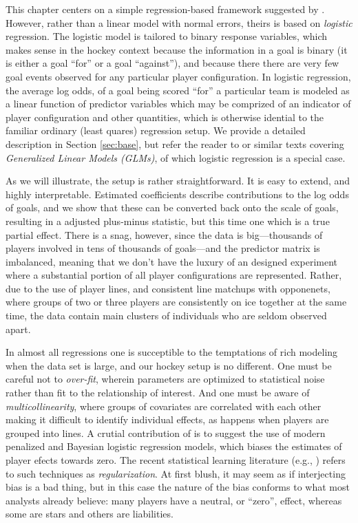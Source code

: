 This chapter centers on a simple regression-based framework suggested by
\cite{gramacy:jensen:taddy:2013}.  However, rather than a linear model
with normal errors, theirs is based on {\em logistic} regression.  The
logistic model is tailored to binary response variables, which makes sense in
the hockey context because the information in a goal is binary (it is either a
goal ``for'' or a goal ``against''), and because there there are very few goal
events observed for any particular player configuration.  In logistic
regression, the average log odds, of a goal being scored ``for'' a particular
team  is modeled as a linear function of predictor variables which may be
comprized of an indicator of player configuration and other quantities, which
is otherwise idential to the familiar ordinary (least quares) regression
setup.  We provide a detailed description in Section \ref{sec:base}, but refer
the reader to \cite{sheather:2009} or similar texts covering {\em Generalized Linear
Models (GLMs)}, of which logistic regression is a special case.

As we will illustrate, the setup is rather straightforward.  It is easy to
extend, and highly interpretable.  Estimated coefficients describe
contributions to the log odds of goals, and we show that these can be
converted back onto the scale of goals, resulting in a adjusted plus-minus
statistic, but this time one which is a true partial effect.  There is a snag,
however, since the data is big---thousands of players involved in tens of
thousands of goals---and the predictor matrix is imbalanced, meaning that we
don't have the luxury of an designed experiment where a substantial portion of
all player configurations are represented.  Rather, due to the use of player
lines, and consistent line matchups with opponenets, where groups of two or
three players are consistently on ice together at the same time, the data
contain main clusters of individuals who are seldom observed apart. 

In almost all regressions one is succeptible to the temptations of rich
modeling when the data set is large, and our hockey setup is no different. One
must be careful not to {\em over-fit}, wherein parameters are optimized to
statistical noise rather than fit to the relationship of interest.  And one
must be aware of {\em multicollinearity}, where groups of covariates are
correlated with each other making it difficult to identify individual effects,
as happens when players are grouped into lines.  A crutial contribution of
\cite{gramacy:jensen:taddy:2013} is to suggest the use of modern penalized and
Bayesian logistic regression models, which biases the estimates of player
efects towards zero.  The recent statistical learning literature (e.g.,
\citet{hastie:tibsh:fried:2001}) refers to such techniques as {\em
regularization}.  At first blush, it may seem as if interjecting bias is a bad
thing, but in this case the nature of the bias conforms to what most analysts
already believe: many players have a neutral, or ``zero'', effect, whereas
some are stars and others are liabilities.  

